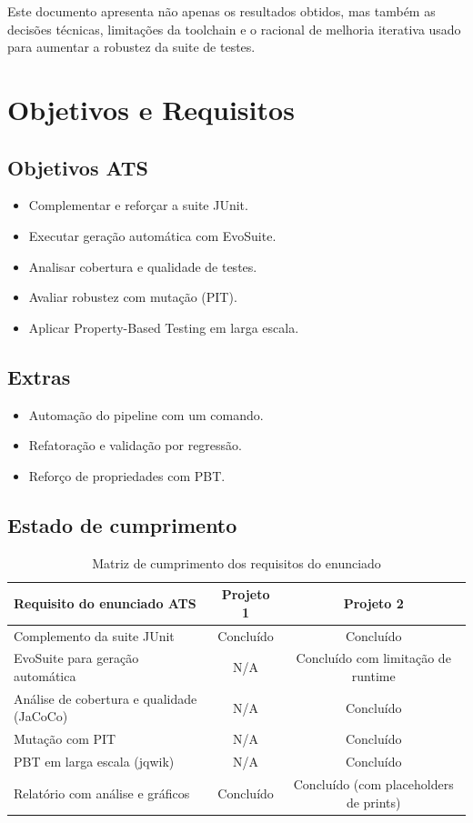 \documentclass{article}
\begin{document}
Este documento apresenta não apenas os resultados obtidos, mas também as decisões técnicas, limitações da toolchain e o racional de melhoria iterativa usado para aumentar a robustez da suite de testes.

\section{Objetivos e Requisitos}
\subsection{Objetivos ATS}
\begin{itemize}
    \item Complementar e reforçar a suite JUnit.
    \item Executar geração automática com EvoSuite.
    \item Analisar cobertura e qualidade de testes.
    \item Avaliar robustez com mutação (PIT).
    \item Aplicar Property-Based Testing em larga escala.
\end{itemize}

\subsection{Extras}
\begin{itemize}
    \item Automação do pipeline com um comando.
    \item Refatoração e validação por regressão.
    \item Reforço de propriedades com PBT.
\end{itemize}

\subsection{Estado de cumprimento}
\begin{table}[H]
\centering
\begin{tabular}{p{}cc}
\toprule
Requisito do enunciado ATS & Projeto 1 & Projeto 2 \\
\midrule
Complemento da suite JUnit & Concluído & Concluído \\
EvoSuite para geração automática & N/A & Concluído com limitação de runtime \\
Análise de cobertura e qualidade (JaCoCo) & N/A & Concluído \\
Mutação com PIT & N/A & Concluído \\
PBT em larga escala (jqwik) & N/A & Concluído \\
Relatório com análise e gráficos & Concluído & Concluído (com placeholders de prints) \\
\bottomrule
\end{tabular}
\caption{Matriz de cumprimento dos requisitos do enunciado}
\end{table}
\end{document}
